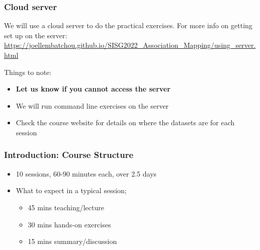 \documentclass{beamer}
\begin{document}
\begin{frame}[fragile]
	\frametitle{\bf Cloud server}
	
	We will use a cloud server to do the practical exercises. 
	For more info on  getting set up on the server:
	{\color{red}
		\url{https://joellembatchou.github.io/SISG2022_Association_Mapping/using_server.html}
	}

	\vspace{1em}
	Things to note:
	\begin{itemize}
		\item {\bf Let us know if you cannot access the server}
		\item We will run command line exercises on the server
		\item Check the course website for details on where the datasets are for each session
	\end{itemize}
\end{frame}







\begin{frame}
\frametitle{\bf Introduction: Course Structure}
\begin{itemize}
\item 10 sessions, 60-90 minutes each, over 2.5 days
\item What to expect in a typical session;
\begin{itemize} 
\item 45 mins teaching/lecture 
\item 30 mins hands-on exercises
\item 15 mins summary/discussion
\end{itemize}
\end{itemize}
\end{frame}
\end{document}
